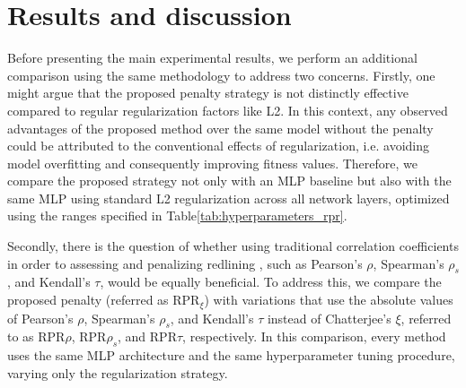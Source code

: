 \section{Results and discussion}

Before presenting the main experimental results, we perform an additional comparison using the same methodology to address two concerns. Firstly, one might argue that the proposed penalty strategy is not distinctly effective compared to regular regularization factors like L2. In this context, any observed advantages of the proposed method over the same model without the penalty could be attributed to the conventional effects of regularization, i.e. avoiding model overfitting and consequently improving fitness values. Therefore, we compare the proposed strategy not only with an MLP baseline but also with the same MLP using standard L2 regularization across all network layers, optimized using the ranges specified in Table\ref{tab:hyperparameters_rpr}. 

Secondly, there is the question of whether using traditional correlation coefficients in order to assessing and penalizing redlining , such as Pearson's $\rho$, Spearman's $\rho_s$, and Kendall's $\tau$, would be equally beneficial. To address this, we compare the proposed penalty (referred as RPR$_\xi$) with variations that use the absolute values of Pearson's $\rho$, Spearman's $\rho_s$, and Kendall's $\tau$ instead of Chatterjee's $\xi$, referred to as RPR$\rho$, RPR${\rho_s}$, and RPR$\tau$, respectively. In this comparison, every method uses the same MLP architecture and the same hyperparameter tuning procedure, varying only the regularization strategy.

